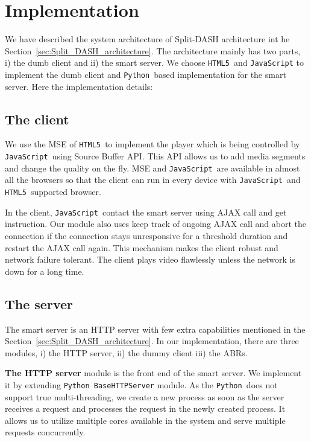 \newcommand{\html}{{\tt HTML5 }}
\newcommand{\js}{{\tt JavaScript }}
\newcommand{\python}{{\tt Python }}


\section{Implementation}
We have described the system architecture of Split-DASH architecture int he Section~\ref{sec:Split_DASH_architecture}. The architecture mainly has two parts, i) the dumb client and ii) the smart server. We choose \html and {\tt JavaScript} to implement the dumb client and \python based implementation for the smart server. Here the implementation details:

\subsection{The client}
We use the MSE of \html to implement the player which is being controlled by \js using Source Buffer API. This API allows us to add media segments and change the quality on the fly. MSE and \js are available in almost all the browsers so that the client can run in every device with \js and \html supported browser.

In the client, \js contact the smart server using AJAX call and get instruction. Our module also uses keep track of ongoing AJAX call and abort the connection if the connection stays unresponsive for a threshold duration and restart the AJAX call again. This mechanism makes the client robust and network failure tolerant. The client plays video flawlessly unless the network is down for a long time.

\subsection{The server}
The smart server is an HTTP server with few extra capabilities mentioned in the Section~\ref{sec:Split_DASH_architecture}. In our implementation, there are three modules, i) the HTTP server, ii) the dummy client iii) the ABRs.

{\bf The HTTP server} module is the front end of the smart server. We implement it by extending \python {\tt BaseHTTPServer} module. As the \python does not support true multi-threading, we create a new process as soon as the server receives a request and processes the request in the newly created process. It allows us to utilize multiple cores available in the system and serve multiple requests concurrently.

